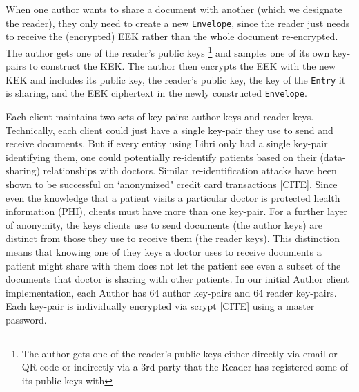 \documentclass[10pt]{article}
\newcommand{\ttt}[1]{\texttt{#1}}
\def\Entry{\ttt{Entry}}
\def\Envelope{\ttt{Envelope}}
\begin{document}
When one author wants to share a document with another (which we designate the reader), they only need to create a new \Envelope{}, since the reader just needs to receive the (encrypted) EEK rather than the whole document re-encrypted. The author gets one of the reader's public keys \footnote{The author gets one of the reader's public keys either directly via email or QR code or indirectly via a 3rd party that the Reader has registered some of its public keys with} and samples one of its own key-pairs to construct the KEK. The author then encrypts the EEK with the new KEK and includes its public key, the reader's public key, the key of the \Entry{} it is sharing, and the EEK ciphertext in the newly constructed \Envelope{}. 

Each client maintains two sets of key-pairs: author keys and reader keys. Technically, each client could just have a single key-pair they use to send and receive documents. But if every entity using Libri only had a single key-pair identifying them, one could potentially re-identify patients based on their (data-sharing) relationships with doctors. Similar re-identification attacks have been shown to be successful on `anonymized" credit card transactions [CITE]. Since even the knowledge that a patient visits a particular doctor is protected health information (PHI), clients must have more than one key-pair. For a further layer of anonymity, the keys clients use to send documents (the author keys) are distinct from those they use to receive them (the reader keys). This distinction means that knowing one of they keys a doctor uses to receive documents a patient might share with them does not let the patient see even a subset of the documents that doctor is sharing with other patients. In our initial Author client implementation, each Author has 64 author key-pairs and 64 reader key-pairs. Each key-pair is individually encrypted via scrypt [CITE] using a master password.
\end{document}
